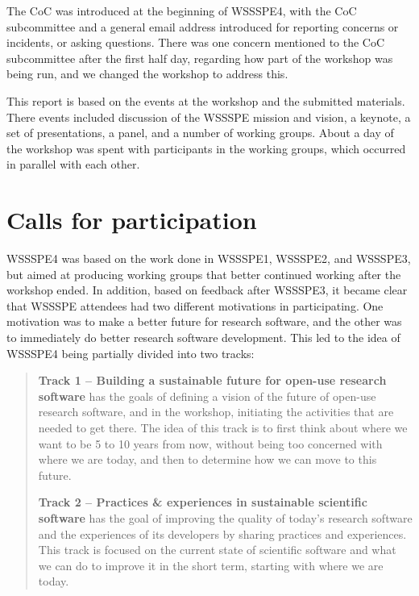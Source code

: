 \documentclass[11pt, oneside]{amsart}
\begin{document}
The CoC was introduced at the beginning of WSSSPE4, with the CoC subcommittee
and a general email address introduced for reporting concerns or incidents, or
asking questions.  There was one concern mentioned to the CoC subcommittee
after the first half day,
regarding how part of the workshop was being run, and we changed the workshop
to address this.

This report is based on the events at the workshop and the submitted materials.
There events included discussion of the WSSSPE mission and vision, a keynote,
a set of presentations, a panel, and a number of working groups.  About a day of the
workshop was spent with participants in the working groups, which occurred in parallel
with each other.

\section{Calls for participation} \label{sec:preworkshop}

WSSSPE4 was based on the work done in WSSSPE1, WSSSPE2, and WSSSPE3, but aimed
at producing working groups that better continued working after the workshop ended.
In addition, based on feedback after WSSSPE3, it became clear that WSSSPE attendees
had two different motivations in participating.  One motivation was to make a better future
for research software, and the other was to immediately do better research software development.
This led to the idea of WSSSPE4 being partially divided into two tracks:

\begin{quote}
    \textbf{Track 1 -- Building a sustainable future for open-use research
    software} has the goals of defining a vision of the future of open-use
    research software, and in the workshop, initiating the activities that are
    needed to get there. The idea of this track is to first think about where
    we want to be 5 to 10 years from now, without being too concerned with
    where we are today, and then to determine how we can move to this future.

    \textbf{Track 2 -- Practices \& experiences in sustainable scientific software}
    has the goal of improving the quality of today's research software and the
    experiences of its developers by sharing practices and experiences.
    This track is focused on the current state of scientific software and what
    we can do to improve it in the short term, starting with where we are today.
\end{quote}
\end{document}
